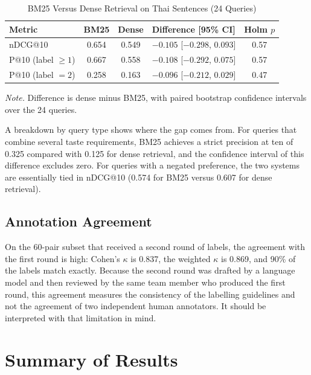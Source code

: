 \begin{table}[htbp]
\centering
\caption{BM25 Versus Dense Retrieval on Thai Sentences (24 Queries)}
\label{tab:thaimetrics}
\small
\begin{tabular}{|p{}|c|c|p{}|c|}
\hline
\textbf{Metric} & \textbf{BM25} & \textbf{Dense} & \textbf{Difference [95\% CI]} & \textbf{Holm $p$} \\
\hline
nDCG@10 & 0.654 & 0.549 & $-0.105$ [$-0.298$, $0.093$] & 0.57 \\
\hline
P@10 (label $\ge 1$) & 0.667 & 0.558 & $-0.108$ [$-0.292$, $0.075$] & 0.57 \\
\hline
P@10 (label $=2$) & 0.258 & 0.163 & $-0.096$ [$-0.212$, $0.029$] & 0.47 \\
\hline
\end{tabular}

\vspace{2pt}
\footnotesize\textit{Note.} Difference is dense minus BM25, with paired bootstrap confidence intervals over the 24 queries.
\end{table}

A breakdown by query type shows where the gap comes from. For queries that combine several taste requirements, BM25 achieves a strict precision at ten of 0.325 compared with 0.125 for dense retrieval, and the confidence interval of this difference excludes zero. For queries with a negated preference, the two systems are essentially tied in nDCG@10 (0.574 for BM25 versus 0.607 for dense retrieval).

\subsection{Annotation Agreement}
\label{sec:resthaiagree}

On the 60-pair subset that received a second round of labels, the agreement with the first round is high: Cohen's $\kappa$ is 0.837, the weighted $\kappa$ is 0.869, and 90\% of the labels match exactly. Because the second round was drafted by a language model and then reviewed by the same team member who produced the first round, this agreement measures the consistency of the labelling guidelines and not the agreement of two independent human annotators. It should be interpreted with that limitation in mind.

\section{Summary of Results}
\label{sec:ressummary}

